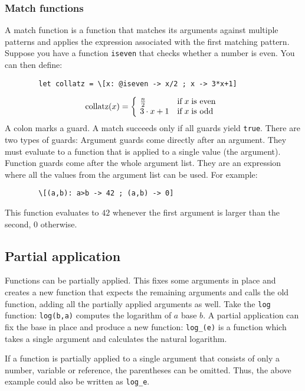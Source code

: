 \documentclass[10pt]{article}
\begin{document}
    \subsubsection{Match functions}
    A match function is a function that matches its arguments against multiple patterns and applies the expression associated with the first matching pattern.
    Suppose you have a function \verb|iseven| that checks whether a number is even.
    You can then define:
    \begin{verbatim}
        let collatz = \[x: @iseven -> x/2 ; x -> 3*x+1]
    \end{verbatim}
    \[
        \mathrm{collatz}(x) = \left\{\kern-\nulldelimiterspace\begin{array}{ll}
            \frac{n}{2}   & \textrm{if}\;x\;\textrm{is even} \\
            3 \cdot x + 1 & \textrm{if}\;x\;\textrm{is odd}
        \end{array} \right.
    \]
    A colon marks a guard.
    A match succeeds only if all guards yield \verb|true|.
    There are two types of guards: Argument guards come directly after an argument.
    They must evaluate to a function that is applied to a single value (the argument).
    Function guards come after the whole argument list.
    They are an expression where all the values from the argument list can be used.
    For example:
    \begin{verbatim}
        \[(a,b): a>b -> 42 ; (a,b) -> 0]
    \end{verbatim}
    This function evaluates to $ 42 $ whenever the first argument is larger than the second, $ 0 $ otherwise.
    
    \subsection{Partial application}\label{subsec:partial-application}
    Functions can be partially applied.
    This fixes some arguments in place and creates a new function that expects the remaining arguments and calls the old function, adding all the partially applied arguments as well.
    Take the \verb|log| function: \verb|log(b,a)| computes the logarithm of $ a $ base $ b $.
    A partial application can fix the base in place and produce a new function:
    \verb|log_(e)| is a function which takes a single argument and calculates the natural logarithm.
    
    If a function is partially applied to a single argument that consists of only a number, variable or reference, the parentheses can be omitted.
    Thus, the above example could also be written as \verb|log_e|.
    
\end{document}
